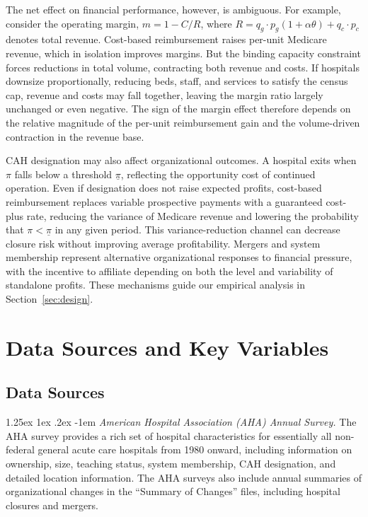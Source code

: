 \documentclass[a4paper, 12pt, twoside]{article}
\makeatletter
\renewcommand\paragraph{\@startsection{paragraph}{4}{\z@}%
   {1.25ex \@plus 1ex \@minus .2ex}%
   {-1em}%
   {\normalfont\itshape}}
\makeatother
\begin{document}
The net effect on financial performance, however, is ambiguous. For example, consider the operating margin, $m = 1 - C/R$, where $R=q_g \cdot p_g(1 + \alpha\theta) + q_c \cdot p_c$ denotes total revenue. Cost-based reimbursement raises per-unit Medicare revenue, which in isolation improves margins. But the binding capacity constraint forces reductions in total volume, contracting both revenue and costs. If hospitals downsize proportionally, reducing beds, staff, and services to satisfy the census cap, revenue and costs may fall together, leaving the margin ratio largely unchanged or even negative. The sign of the margin effect therefore depends on the relative magnitude of the per-unit reimbursement gain and the volume-driven contraction in the revenue base.

CAH designation may also affect organizational outcomes. A hospital exits when $\pi$ falls below a threshold $\underline{\pi}$, reflecting the opportunity cost of continued operation. Even if designation does not raise expected profits, cost-based reimbursement replaces variable prospective payments with a guaranteed cost-plus rate, reducing the variance of Medicare revenue and lowering the probability that $\pi < \underline{\pi}$ in any given period. This variance-reduction channel can decrease closure risk without improving average profitability. Mergers and system membership represent alternative organizational responses to financial pressure, with the incentive to affiliate depending on both the level and variability of standalone profits. These mechanisms guide our empirical analysis in Section~\ref{sec:design}.

\section{Data Sources and Key Variables}
\label{sec:data}

\subsection{Data Sources}

\paragraph{\textit{American Hospital Association (AHA) Annual Survey.}}  
The AHA survey provides a rich set of hospital characteristics for essentially all non-federal general acute care hospitals from 1980 onward, including information on ownership, size, teaching status, system membership, CAH designation, and detailed location information. The AHA surveys also include annual summaries of organizational changes in the ``Summary of Changes'' files, including hospital closures and mergers.
\end{document}
